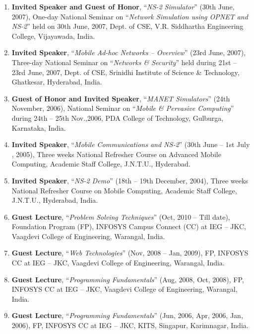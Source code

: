 \begin{enumerate} [label=(T\arabic*).]
\item
\textbf{Invited Speaker and Guest of Honor}, “\textit{NS-2 Simulator}” (30th June, 2007),  One-day National Seminar on “\textit{Network Simulation using OPNET and NS-2}” held on 30th June, 2007, Dept. of CSE, V.R. Siddhartha Engineering College, Vijayawada, India.

\item
\textbf{Invited Speaker}, “\textit{Mobile Ad-hoc Networks – Overview}” (23rd June, 2007),  Three-day National Seminar on “\textit{Networks \& Security}” held during 21st – 23rd June, 2007, Dept. of CSE, Srinidhi Institute of Science \& Technology, Ghatkesar, Hyderabad, India.

\item
\textbf{Guest of Honor and Invited Speaker}, “\textit{MANET Simulators}” (24th November, 2006), National Seminar on “\textit{Mobile \& Pervasive Computing}” during 24th – 25th Nov.,2006, PDA College of Technology, Gulburga, Karnataka, India.

\item
\textbf{Invited Speaker}, “\textit{Mobile Communications and NS-2}” (30th June – 1st  July , 2005), Three weeks National Refresher Course on Advanced Mobile Computing, Academic Staff College, J.N.T.U., Hyderabad.

\item
\textbf{Invited Speaker}, “\textit{NS-2 Demo}” (18th – 19th December, 2004), Three weeks National Refresher Course on Mobile Computing, Academic Staff College, J.N.T.U., Hyderabad, India.

\item
\textbf{Guest Lecture}, “\textit{Problem Solving Techniques}” (Oct, 2010 – Till date), Foundation Program (FP), INFOSYS Campus Connect (CC) at IEG – JKC, Vaagdevi College of Engineering, Warangal, India.

\item
\textbf{Guest Lecture}, “\textit{Web Technologies}” (Nov, 2008 – Jan, 2009), FP, INFOSYS CC at IEG – JKC, Vaagdevi College of Engineering, Warangal, India.

\item
\textbf{Guest Lecture}, “\textit{Programming Fundamentals}” (Aug, 2008, Oct, 2008), FP, INFOSYS CC at IEG – JKC, Vaagdevi College of Engineering, Warangal, India.

\item
\textbf{Guest Lecture}, “\textit{Programming Fundamentals}” (Jun, 2006, Apr, 2006, Jan, 2006), FP, INFOSYS CC at IEG – JKC,  KITS, Singapur, Karimnagar, India.



\end{enumerate}